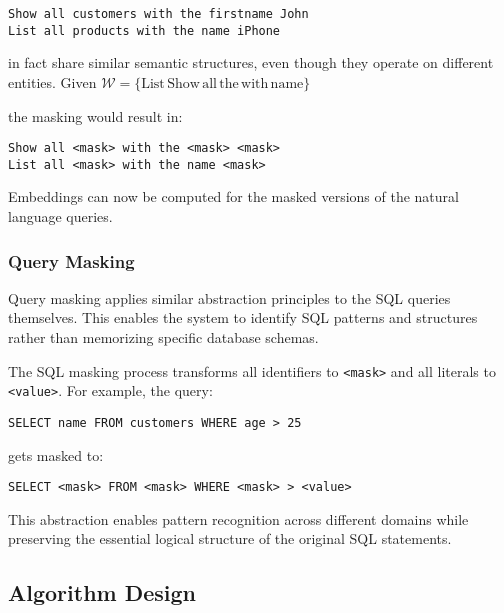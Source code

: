 \begin{verbatim}
Show all customers with the firstname John
List all products with the name iPhone
\end{verbatim}

in fact share similar semantic structures, even though they operate on different entities.
Given $\mathcal{W} = \{\text{List}\, \text{Show}\, \text{all}\, \text{the}\, \text{with}\, \text{name}\}$

the masking would result in:

\begin{verbatim}
Show all <mask> with the <mask> <mask>
List all <mask> with the name <mask>
\end{verbatim}

Embeddings can now be computed for the masked versions of the natural language queries.

\subsubsection{Query Masking}

Query masking applies similar abstraction principles to the SQL queries themselves.
This enables the system to identify SQL patterns and structures rather than
memorizing specific database schemas.

The SQL masking process transforms all identifiers to \texttt{<mask>} and all literals
to \texttt{<value>}. For example, the query:

\begin{verbatim}
SELECT name FROM customers WHERE age > 25
\end{verbatim}

gets masked to:

\begin{verbatim}
SELECT <mask> FROM <mask> WHERE <mask> > <value>
\end{verbatim}

This abstraction enables pattern recognition across different domains while
preserving the essential logical structure of the original SQL statements.









\subsection{Algorithm Design}

